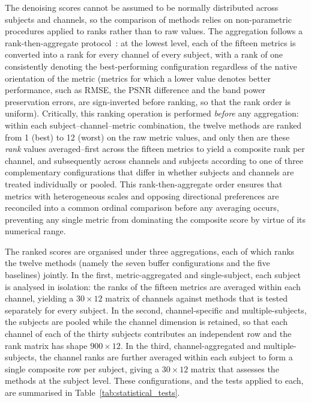 \documentclass[MScCS,12pt,oneside,final]{uccthesis}
\begin{document}
The denoising scores cannot be assumed to be normally distributed across subjects and channels, so the comparison of methods relies on non-parametric procedures applied to ranks rather than to raw values. The aggregation follows a rank-then-aggregate protocol~\parencite{friedman1937use}: at the lowest level, each of the fifteen metrics is converted into a rank for every channel of every subject, with a rank of one consistently denoting the best-performing configuration regardless of the native orientation of the metric (metrics for which a lower value denotes better performance, such as RMSE, the PSNR difference and the band power preservation errors, are sign-inverted before ranking, so that the rank order is uniform). Critically, this ranking operation is performed \emph{before} any aggregation: within each subject--channel--metric combination, the twelve methods are ranked from 1 (best) to 12 (worst) on the raw metric values, and only then are these \emph{rank} values averaged--first across the fifteen metrics to yield a composite rank per channel, and subsequently across channels and subjects according to one of three complementary configurations that differ in whether subjects and channels are treated individually or pooled. This rank-then-aggregate order ensures that metrics with heterogeneous scales and opposing directional preferences are reconciled into a common ordinal comparison before any averaging occurs, preventing any single metric from dominating the composite score by virtue of its numerical range.

The ranked scores are organised under three aggregations, each of which ranks the twelve methods (namely the seven buffer configurations and the five baselines) jointly. In the first, metric-aggregated and single-subject, each subject is analysed in isolation: the ranks of the fifteen metrics are averaged within each channel, yielding a $30 \times 12$ matrix of channels against methods that is tested separately for every subject. In the second, channel-specific and multiple-subjects, the subjects are pooled while the channel dimension is retained, so that each channel of each of the thirty subjects contributes an independent row and the rank matrix has shape $900 \times 12$. In the third, channel-aggregated and multiple-subjects, the channel ranks are further averaged within each subject to form a single composite row per subject, giving a $30 \times 12$ matrix that assesses the methods at the subject level. These configurations, and the tests applied to each, are summarised in Table~\ref{tab:statistical_tests}.
\end{document}
